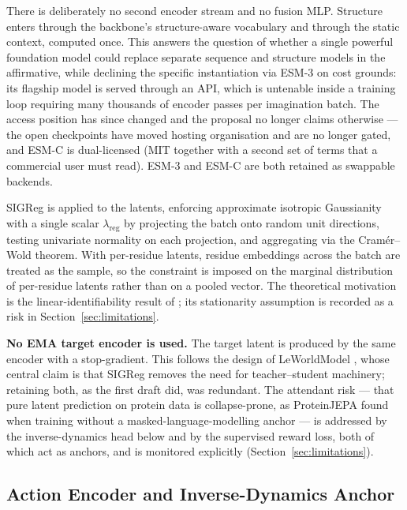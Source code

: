 \documentclass[12pt, a4paper]{article}
\begin{document}
There is deliberately no second encoder stream and no fusion MLP. Structure enters through the backbone's structure-aware vocabulary and through the static context, computed once. This answers the question of whether a single powerful foundation model could replace separate sequence and structure models in the affirmative, while declining the specific instantiation via ESM-3 on cost grounds: its flagship model is served through an API, which is untenable inside a training loop requiring many thousands of encoder passes per imagination batch. The access position has since changed and the proposal no longer claims otherwise --- the open checkpoints have moved hosting organisation and are no longer gated, and ESM-C is dual-licensed (MIT together with a second set of terms that a commercial user must read). ESM-3 and ESM-C are both retained as swappable backends.

SIGReg \citep{maes2026leworldmodel} is applied to the latents, enforcing approximate isotropic Gaussianity with a single scalar $\lambda_{\text{reg}}$ by projecting the batch onto random unit directions, testing univariate normality on each projection, and aggregating via the Cram\'{e}r--Wold theorem. With per-residue latents, residue embeddings across the batch are treated as the sample, so the constraint is imposed on the marginal distribution of per-residue latents rather than on a pooled vector. The theoretical motivation is the linear-identifiability result of \citet{klindt2026whenlejepa}; its stationarity assumption is recorded as a risk in Section~\ref{sec:limitations}.

\textbf{No EMA target encoder is used.} The target latent is produced by the same encoder with a stop-gradient. This follows the design of LeWorldModel \citep{maes2026leworldmodel}, whose central claim is that SIGReg removes the need for teacher--student machinery; retaining both, as the first draft did, was redundant. The attendant risk --- that pure latent prediction on protein data is collapse-prone, as ProteinJEPA found when training without a masked-language-modelling anchor \citep{ofer2026proteinjepa} --- is addressed by the inverse-dynamics head below and by the supervised reward loss, both of which act as anchors, and is monitored explicitly (Section~\ref{sec:limitations}).

\subsection{Action Encoder and Inverse-Dynamics Anchor}
\label{sec:inverse}
\end{document}
